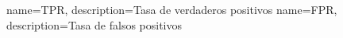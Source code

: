 {
    name=TPR,
    description={Tasa de verdaderos positivos}
}
{
    name=FPR,
    description={Tasa de falsos positivos}
}

